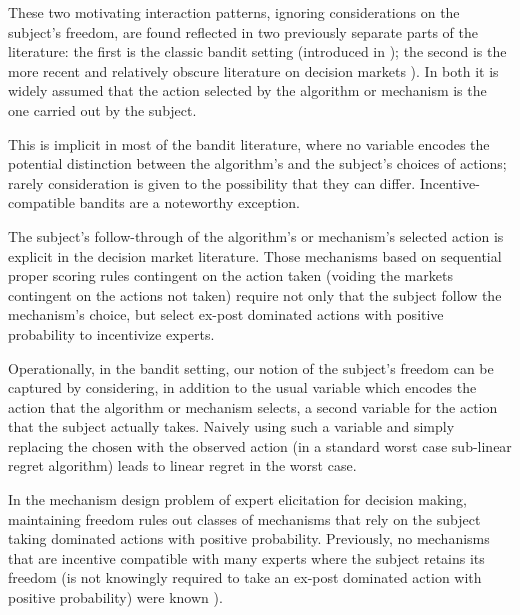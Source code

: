 These two motivating interaction patterns, ignoring considerations on the subject's freedom, are found reflected in two previously separate parts of the literature: the first is the classic bandit setting (introduced in \citep{thompson:33}); the second is the more recent and relatively obscure literature on decision markets \citep{berg2003prediction,hanson2002decision,othman2010decision,boutilier2012eliciting,chen2014eliciting}). In both it is widely assumed that the action selected by the algorithm or mechanism is the one carried out by the subject.

This is implicit in most of the bandit literature, where no variable encodes the potential distinction between the algorithm's and the subject's choices of actions; rarely consideration is given to the possibility that they can differ. Incentive-compatible bandits \citep{kremer2014implementing,mansour2015bayesian,mansour2016bayesian} are a noteworthy exception.

The subject's follow-through of the algorithm's or mechanism's selected action is explicit in the decision market literature. Those mechanisms based on sequential proper scoring rules contingent on the action taken (voiding the markets contingent on the actions not taken) require not only that the subject follow the mechanism's choice, but select ex-post dominated actions with positive probability to incentivize experts.

Operationally, in the bandit setting, our notion of the subject's freedom can be captured by considering, in addition to the usual variable which encodes the action that the algorithm or mechanism selects, a second variable for the action that the subject actually takes. Naively using such a variable and simply replacing the chosen with the observed action (in a standard worst case sub-linear regret algorithm) leads to linear regret in the worst case.

In the mechanism design problem of expert elicitation for decision making, maintaining freedom rules out classes of mechanisms that rely on the subject taking dominated actions with positive probability. Previously, no mechanisms that are incentive compatible with many experts where the subject retains its freedom (is not knowingly required to take an ex-post dominated action with positive probability) were known \citep{othman2010decision,chen2014eliciting}).



